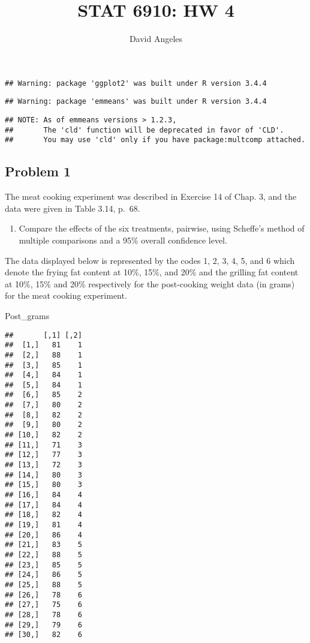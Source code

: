 \documentclass[12pt,]{article}
\title{STAT 6910: HW 4}
\author{David Angeles}
\date{}
\newenvironment{Shaded}{\begin{snugshade}}{\end{snugshade}}
\newcommand{\NormalTok}[1]{#1}
\providecommand{\tightlist}{%
  \setlength{\itemsep}{0pt}\setlength{\parskip}{0pt}}
\begin{document}
\maketitle

\begin{verbatim}
## Warning: package 'ggplot2' was built under R version 3.4.4
\end{verbatim}

\begin{verbatim}
## Warning: package 'emmeans' was built under R version 3.4.4
\end{verbatim}

\begin{verbatim}
## NOTE: As of emmeans versions > 1.2.3,
##       The 'cld' function will be deprecated in favor of 'CLD'.
##       You may use 'cld' only if you have package:multcomp attached.
\end{verbatim}

\subsection{Problem 1}\label{problem-1}

The meat cooking experiment was described in Exercise 14 of Chap. 3, and
the data were given in Table 3.14, p.~68.

\begin{enumerate}
\def\labelenumi{(\alph{enumi})}
\tightlist
\item
  Compare the effects of the six treatments, pairwise, using Scheffe's
  method of multiple comparisons and a 95\% overall confidence level.
\end{enumerate}

The data displayed below is represented by the codes 1, 2, 3, 4, 5, and
6 which denote the frying fat content at 10\%, 15\%, and 20\% and the
grilling fat content at 10\%, 15\% and 20\% respectively for the
post-cooking weight data (in grams) for the meat cooking experiment.

\begin{Shaded}
\begin{Highlighting}[]
\NormalTok{Post_grams }
\end{Highlighting}
\end{Shaded}

\begin{verbatim}
##       [,1] [,2]
##  [1,]   81    1
##  [2,]   88    1
##  [3,]   85    1
##  [4,]   84    1
##  [5,]   84    1
##  [6,]   85    2
##  [7,]   80    2
##  [8,]   82    2
##  [9,]   80    2
## [10,]   82    2
## [11,]   71    3
## [12,]   77    3
## [13,]   72    3
## [14,]   80    3
## [15,]   80    3
## [16,]   84    4
## [17,]   84    4
## [18,]   82    4
## [19,]   81    4
## [20,]   86    4
## [21,]   83    5
## [22,]   88    5
## [23,]   85    5
## [24,]   86    5
## [25,]   88    5
## [26,]   78    6
## [27,]   75    6
## [28,]   78    6
## [29,]   79    6
## [30,]   82    6
\end{verbatim}
\end{document}
